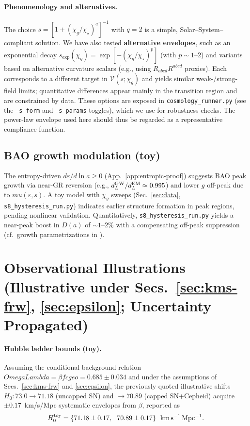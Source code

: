 \documentclass[aps,prd,onecolumn,superscriptaddress,nofootinbib]{revtex4-2}
\def\OmL{OmegaLambda}%
\def\cgeo{cgeo}%
\def\mu{mu}%
\def\Omega_\Lambda{OmegaLambda}%
\providecommand{\OmL}{\Omega_\Lambda}
\providecommand{\cgeo}{c_{\rm geo}}
\providecommand{\be}{\begin{equation}}
\providecommand{\ee}{\end{equation}}
\begin{document}
\paragraph{Phenomenology and alternatives.}
The choice $s=[1+(\chi_g/\chi_\star)^q]^{-1}$ with \(q=2\) is a simple, Solar–System–compliant solution. We have also tested \textbf{alternative envelopes}, such as an exponential decay \(s_{\exp}(\chi_g)=\exp[-(\chi_g/\chi_\star)^p]\) (with \(p\!\sim\!1\text{--}2\)) and variants based on alternative curvature scalars (e.g., using \(R_{abcd}R^{abcd}\) proxies). Each corresponds to a different target in \(\mathcal V(s;\chi_g)\) and yields similar weak-/strong-field limits; quantitative differences appear mainly in the transition region and are constrained by data. These options are exposed in \texttt{cosmology\_runner.py} (see the \texttt{--s-form} and \texttt{--s-params} toggles), which we use for robustness checks. The power-law envelope used here should thus be regarded as a representative compliance function.

\subsection{BAO growth modulation (toy)}
The entropy-driven \(d\varepsilon/d\ln a \geq 0\) (App.~\ref{app:entropic-proof}) suggests BAO peak growth via near-GR reversion (e.g., \(d_L^{\rm GW}/d_L^{\rm EM}\approx 0.995\)) and lower \(g\) off-peak due to \(\mu(\varepsilon,s)\). A toy model with \(\chi_g\) sweeps (Sec.~\ref{sec:data}, \texttt{s8\_hysteresis\_run.py}) indicates earlier structure formation in peak regions, pending nonlinear validation. Quantitatively, \texttt{s8\_hysteresis\_run.py} yields a near-peak boost in \(D(a)\) of \(\sim 1\text{--}2\%\) with a compensating off-peak suppression (cf.\ growth parametrizations in \cite{BelliniSawicki2014}).

\section{Observational Illustrations (Illustrative under Secs.~\ref{sec:kms-frw}, \ref{sec:epsilon}; Uncertainty Propagated)}
\label{sec:obs}

\paragraph{Hubble ladder bounds (toy).}
Assuming the conditional background relation \(\OmL=\beta f\cgeo=0.685\pm 0.034\) and under the assumptions of Secs.~\ref{sec:kms-frw} and \ref{sec:epsilon}, the previously quoted illustrative shifts \(H_0: 73.0\to 71.18\) (uncapped SN) and \(\to 70.89\) (capped SN+Cepheid) acquire \(\pm 0.17\)~km/s/Mpc systematic envelopes from \(\beta\), reported as
\be
H_0^{\rm toy}=\{71.18\pm 0.17,\ \ 70.89\pm 0.17\}\ \ \mathrm{km\,s^{-1}\,Mpc^{-1}}.
\ee
\end{document}
